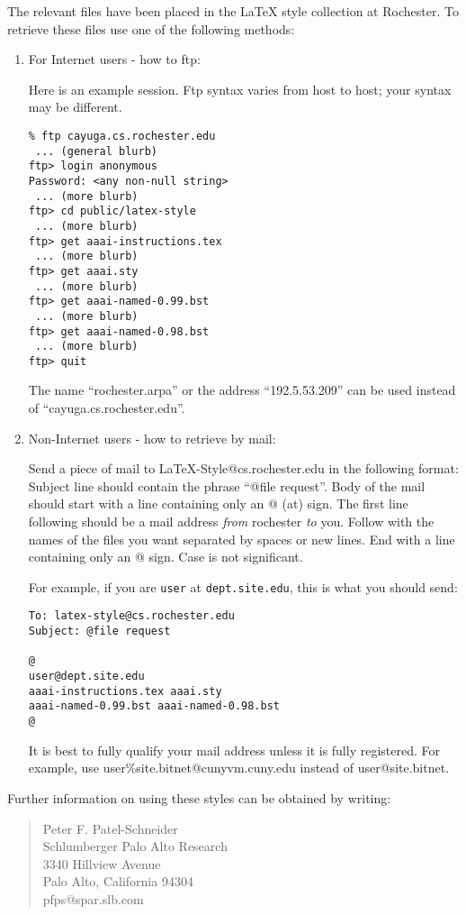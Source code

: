 The relevant files have been placed in the \LaTeX{} style collection at
Rochester.
To retrieve these files use one of the following methods:
\begin{enumerate}
\item  For Internet users - how to ftp:

Here is an example session.  Ftp syntax varies from host to
host; your syntax may be different.

\begin{verbatim}
% ftp cayuga.cs.rochester.edu
 ... (general blurb)
ftp> login anonymous
Password: <any non-null string>
 ... (more blurb)
ftp> cd public/latex-style
 ... (more blurb)
ftp> get aaai-instructions.tex
 ... (more blurb)
ftp> get aaai.sty
 ... (more blurb)
ftp> get aaai-named-0.99.bst
 ... (more blurb)
ftp> get aaai-named-0.98.bst
 ... (more blurb)
ftp> quit
\end{verbatim}

The name ``rochester.arpa'' or the address 
``192.\discretionary{}{}{}5.\discretionary{}{}{}53.\discretionary{}{}{}209''
can be used instead of ``cayuga.cs.rochester.edu''.

\item  Non-Internet users - how to retrieve by mail:

Send a piece of mail to LaTeX-Style@cs.rochester.edu
in the following format:
Subject line should contain the phrase ``@file request''.  Body of the
mail should start with a line containing only an @ (at) sign.  
The first line following should be a mail address {\em from}
rochester {\em to} you.  Follow with the names of the files you want
separated by spaces or new lines.
End with a line containing only an @ sign.  Case is not significant.

For example, if you are {\tt user} at {\tt dept.site.edu}, this is what you
should send:  

\begin{verbatim}
To: latex-style@cs.rochester.edu
Subject: @file request

@
user@dept.site.edu
aaai-instructions.tex aaai.sty 
aaai-named-0.99.bst aaai-named-0.98.bst 
@
\end{verbatim}

It is best to fully qualify your mail address unless it is fully
registered.  For example, use user\%site.bitnet@cunyvm.cuny.edu instead of
user@site.bitnet.

\end{enumerate}

Further information on using these styles can be obtained by writing:
\begin{quote}
Peter F. Patel-Schneider \\
Schlumberger Palo Alto Research \\
3340 Hillview Avenue \\
Palo Alto, California \hspace{1em} 94304 \\
pfps@spar.slb.com
\end{quote}

